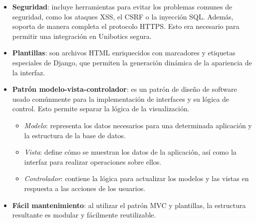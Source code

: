 \begin{itemize}
    
    \item \textbf{Seguridad}: incluye herramientas para evitar los problemas comunes de seguridad, como los ataques XSS, el CSRF o la inyección SQL. Además, soporta de manera completa el protocolo HTTPS. Esto era necesario para permitir una integración en Unibotics segura. 
    
    
    \item \textbf{Plantillas}: son archivos HTML enriquecidos con marcadores y etiquetas especiales de Django, que permiten la generación dinámica de la apariencia de la interfaz. 
    
    \item \textbf{Patrón modelo-vista-controlador}: es un patrón de diseño de software usado comúnmente para la implementación de interfaces y su lógica de control. Esto permite separar la lógica de la visualización. 
    \begin{itemize}
        \item \textit{Modelo}: representa los datos necesarios para una determinada aplicación y la estructura de la base de datos. 
        \item \textit{Vista}: define cómo se muestran los datos de la aplicación, así como la interfaz para realizar operaciones sobre ellos. 
        \item \textit{Controlador}: contiene la lógica para actualizar los modelos y las vistas en respuesta a las acciones de los usuarios. 
    \end{itemize}

    \item \textbf{Fácil mantenimiento}: al utilizar el patrón MVC y plantillas, la estructura resultante es modular y fácilmente reutilizable.
    
\end{itemize}

